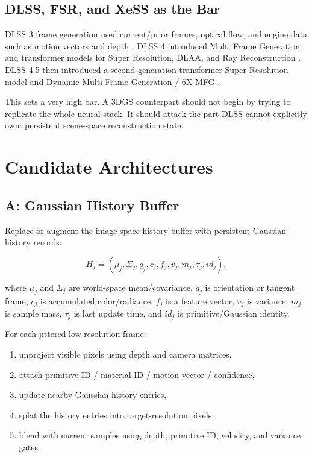 \documentclass[11pt]{article}
\begin{document}
\subsection{DLSS, FSR, and XeSS as the Bar}

DLSS 3 frame generation used current/prior frames, optical flow, and engine data
such as motion vectors and depth \cite{nvidia2022dlss3}. DLSS 4 introduced
Multi Frame Generation and transformer models for Super Resolution, DLAA, and
Ray Reconstruction \cite{nvidia2025dlss4,nvidia2025dlss4research}. DLSS 4.5
then introduced a second-generation transformer Super Resolution model and
Dynamic Multi Frame Generation / 6X MFG \cite{nvidia2026dlss45}.

This sets a very high bar. A 3DGS counterpart should not begin by trying to
replicate the whole neural stack. It should attack the part DLSS cannot
explicitly own: persistent scene-space reconstruction state.

\section{Candidate Architectures}

\subsection{A: Gaussian History Buffer}

Replace or augment the image-space history buffer with persistent Gaussian
history records:

\[
  H_j =
  (\mu_j, \Sigma_j, q_j, c_j, f_j, v_j, m_j, \tau_j, id_j),
\]

where $\mu_j$ and $\Sigma_j$ are world-space mean/covariance, $q_j$ is
orientation or tangent frame, $c_j$ is accumulated color/radiance, $f_j$ is a
feature vector, $v_j$ is variance, $m_j$ is sample mass, $\tau_j$ is last update
time, and $id_j$ is primitive/Gaussian identity.

For each jittered low-resolution frame:

\begin{enumerate}
  \item unproject visible pixels using depth and camera matrices,
  \item attach primitive ID / material ID / motion vector / confidence,
  \item update nearby Gaussian history entries,
  \item splat the history entries into target-resolution pixels,
  \item blend with current samples using depth, primitive ID, velocity, and
        variance gates.
\end{enumerate}
\end{document}
